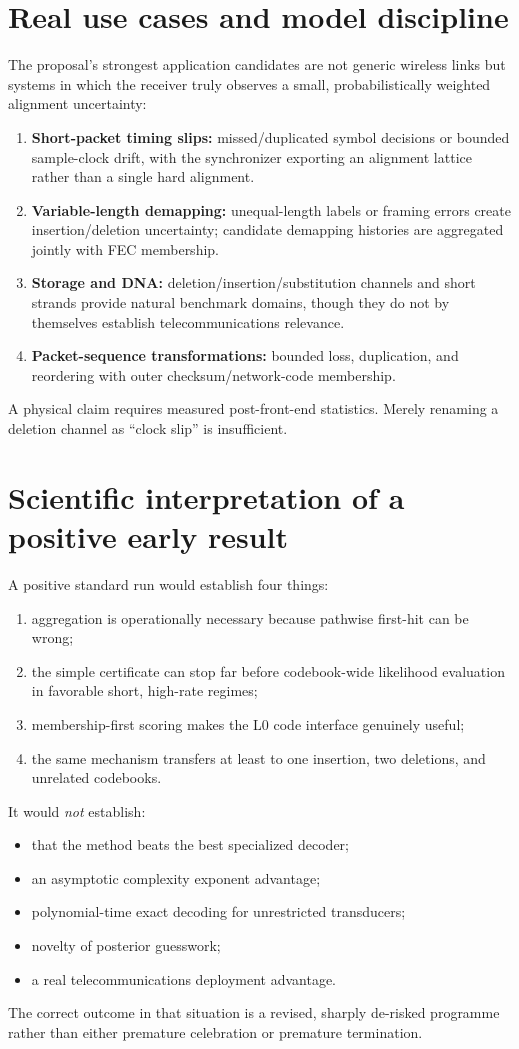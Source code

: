 \documentclass[11pt]{article}
\begin{document}
\section{Real use cases and model discipline}
The proposal's strongest application candidates are not generic wireless links but systems in which the receiver truly observes a small, probabilistically weighted alignment uncertainty:
\begin{enumerate}
\item \textbf{Short-packet timing slips:} missed/duplicated symbol decisions or bounded sample-clock drift, with the synchronizer exporting an alignment lattice rather than a single hard alignment.
\item \textbf{Variable-length demapping:} unequal-length labels or framing errors create insertion/deletion uncertainty; candidate demapping histories are aggregated jointly with FEC membership.
\item \textbf{Storage and DNA:} deletion/insertion/substitution channels and short strands provide natural benchmark domains, though they do not by themselves establish telecommunications relevance.
\item \textbf{Packet-sequence transformations:} bounded loss, duplication, and reordering with outer checksum/network-code membership.
\end{enumerate}
A physical claim requires measured post-front-end statistics. Merely renaming a deletion channel as ``clock slip'' is insufficient.

\section{Scientific interpretation of a positive early result}
A positive standard run would establish four things:
\begin{enumerate}
\item aggregation is operationally necessary because pathwise first-hit can be wrong;
\item the simple certificate can stop far before codebook-wide likelihood evaluation in favorable short, high-rate regimes;
\item membership-first scoring makes the L0 code interface genuinely useful;
\item the same mechanism transfers at least to one insertion, two deletions, and unrelated codebooks.
\end{enumerate}
It would \emph{not} establish:
\begin{itemize}
\item that the method beats the best specialized decoder;
\item an asymptotic complexity exponent advantage;
\item polynomial-time exact decoding for unrestricted transducers;
\item novelty of posterior guesswork;
\item a real telecommunications deployment advantage.
\end{itemize}
The correct outcome in that situation is a revised, sharply de-risked programme rather than either premature celebration or premature termination.
\end{document}
